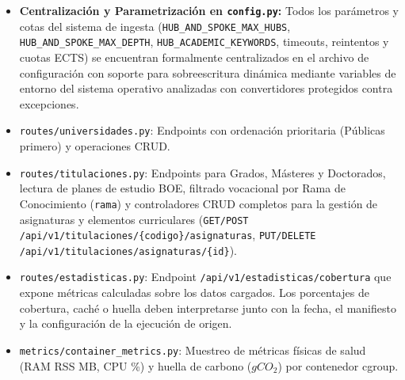 \begin{itemize}
    \item \textbf{Centralización y Parametrización en \texttt{config.py}:} Todos los parámetros y cotas del sistema de ingesta (\texttt{HUB\_AND\_SPOKE\_MAX\_HUBS}, \texttt{HUB\_AND\_SPOKE\_MAX\_DEPTH}, \texttt{HUB\_ACADEMIC\_KEYWORDS}, timeouts, reintentos y cuotas ECTS) se encuentran formalmente centralizados en el archivo de configuración con soporte para sobreescritura dinámica mediante variables de entorno del sistema operativo analizadas con convertidores protegidos contra excepciones.
    \item \texttt{routes/universidades.py}: Endpoints con ordenación prioritaria (Públicas primero) y operaciones CRUD.
    \item \texttt{routes/titulaciones.py}: Endpoints para Grados, Másteres y Doctorados, lectura de planes de estudio BOE, filtrado vocacional por Rama de Conocimiento (\texttt{rama}) y controladores CRUD completos para la gestión de asignaturas y elementos curriculares (\texttt{GET/POST /api/v1/titulaciones/\{codigo\}/asignaturas}, \texttt{PUT/DELETE /api/v1/titulaciones/asignaturas/\{id\}}).
    \item \texttt{routes/estadisticas.py}: Endpoint \texttt{/api/v1/estadisticas/cobertura} que expone métricas calculadas sobre los datos cargados. Los porcentajes de cobertura, caché o huella deben interpretarse junto con la fecha, el manifiesto y la configuración de la ejecución de origen.
    \item \texttt{metrics/container\_metrics.py}: Muestreo de métricas físicas de salud (RAM RSS MB, CPU \%) y huella de carbono ($gCO_2$) por contenedor cgroup.
\end{itemize}


